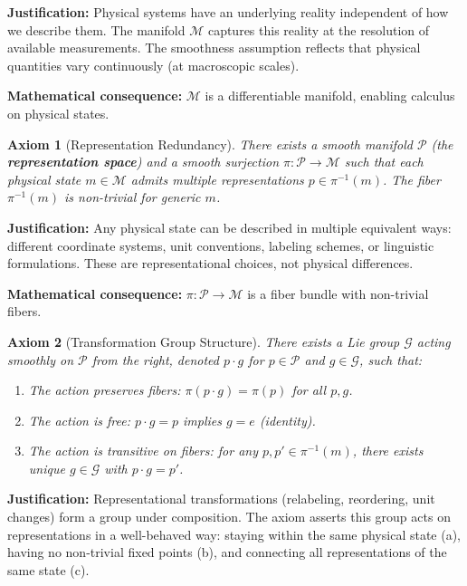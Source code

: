 \documentclass[11pt]{article}
\newtheorem{axiom}{Axiom}
\begin{document}
\textbf{Justification:} Physical systems have an underlying reality independent of how we describe them. The manifold $\mathcal{M}$ captures this reality at the resolution of available measurements.
The smoothness assumption reflects that physical quantities vary continuously (at macroscopic
scales).

\textbf{Mathematical consequence:} $\mathcal{M}$ is a differentiable manifold, enabling calculus on physical
states.

\begin{axiom}[Representation Redundancy]
There exists a smooth manifold $\mathcal{P}$ (the \textbf{representation space}) and a smooth surjection $\pi : \mathcal{P} \to \mathcal{M}$ such that each physical state $m \in \mathcal{M}$ admits
multiple representations $p \in \pi^{-1}(m)$. The fiber $\pi^{-1}(m)$ is non-trivial for generic $m$.
\end{axiom}

\textbf{Justification:} Any physical state can be described in multiple equivalent ways: different
coordinate systems, unit conventions, labeling schemes, or linguistic formulations. These are
representational choices, not physical differences.

\textbf{Mathematical consequence:} $\pi : \mathcal{P} \to \mathcal{M}$ is a fiber bundle with non-trivial fibers.

\begin{axiom}[Transformation Group Structure]
There exists a Lie group $\mathcal{G}$ acting smoothly on
$\mathcal{P}$ from the right, denoted $p \cdot g$ for $p \in \mathcal{P}$ and $g \in \mathcal{G}$, such that:
\begin{enumerate}
    \item[(a)] The action preserves fibers: $\pi(p \cdot g) = \pi(p)$ for all $p, g$.
    \item[(b)] The action is free: $p \cdot g = p$ implies $g = e$ (identity).
    \item[(c)] The action is transitive on fibers: for any $p, p' \in \pi^{-1}(m)$, there exists unique $g \in \mathcal{G}$ with $p \cdot g = p'$.
\end{enumerate}
\end{axiom}

\textbf{Justification:} Representational transformations (relabeling, reordering, unit changes) form
a group under composition. The axiom asserts this group acts on representations in a well-behaved way: staying within the same physical state (a), having no non-trivial fixed points (b),
and connecting all representations of the same state (c).
\end{document}
